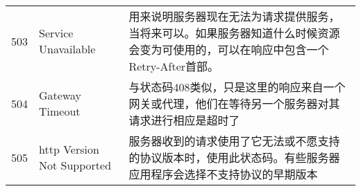 \begin{longtable}[]{@{}cll@{}}
\begin{minipage}[t]{0.32\columnwidth}
503\strut
\end{minipage} & \begin{minipage}[t]{0.30\columnwidth}\raggedright\strut
Service Unavailable\strut
\end{minipage} & \begin{minipage}[t]{0.30\columnwidth}\raggedright\strut
用来说明服务器现在无法为请求提供服务，当将来可以。如果服务器知道什么时候资源会变为可使用的，可以在响应中包含一个Retry-After首部。\strut
\end{minipage}\tabularnewline
\begin{minipage}[t]{0.32\columnwidth}\centering\strut
504\strut
\end{minipage} & \begin{minipage}[t]{0.30\columnwidth}\raggedright\strut
Gateway Timeout\strut
\end{minipage} & \begin{minipage}[t]{0.30\columnwidth}\raggedright\strut
与状态码408类似，只是这里的响应来自一个网关或代理，他们在等待另一个服务器对其请求进行相应是超时了\strut
\end{minipage}\tabularnewline
\begin{minipage}[t]{0.32\columnwidth}\centering\strut
505\strut
\end{minipage} & \begin{minipage}[t]{0.30\columnwidth}\raggedright\strut
http Version Not Supported\strut
\end{minipage} & \begin{minipage}[t]{0.30\columnwidth}\raggedright\strut
服务器收到的请求使用了它无法或不愿支持的协议版本时，使用此状态码。有些服务器应用程序会选择不支持协议的早期版本\strut
\end{minipage}\tabularnewline
\bottomrule
\end{longtable}
